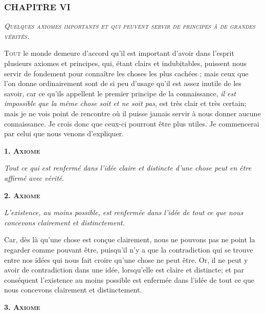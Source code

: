 \subsubsection{\centering \Large CHAPITRE VI}
\begin{center}\emph{\large\scshape Quelques axiomes importants et qui peuvent servir de principes à de grandes vérités.}\end{center}

	\lettrine{T}{out} le monde demeure d'accord qu'il est important d'avoir dans l'esprit plusieurs axiomes et principes, qui, étant clairs et indubitables, puissent nous servir de fondement pour connaître les choses les plus cachées ; mais ceux que l'on donne ordinairement sont de si peu d'usage qu'il est assez inutile de les savoir, car ce qu'ils appellent le premier principe de la connaissance, \emph{il est impossible que la même chose soit et ne soit pas}, est très clair et très certain; mais je ne vois point de rencontre où il puisse jamais servir à nous donner aucune connaissance. Je crois donc que ceux-ci pourront être plus utiles. Je commencerai par celui que nous venons d'expliquer.

\begin{center}{\scshape\bfseries 1. Axiome}\end{center}

	\emph{Tout ce qui est renfermé dans l'idée claire et distincte d'une chose peut en être affirmé avec vérité}.

\begin{center}{\scshape\bfseries 2. Axiome}\end{center}

	\emph{L'existence, au moins possible, est renfermée dans l'idée de tout ce que nous concevons clairement et distinctement}.

Car, dès là qu'une chose est conçue clairement, nous ne pouvons pas ne point la regarder comme pouvant être, puisqu'il n'y a que la contradiction qui se trouve entre nos idées qui nous fait croire qu'une chose ne peut être. Or, il ne peut y avoir de contradiction dans une idée, lorsqu'elle est claire et distincte; et par conséquent l'existence au moins possible est enfermée dans l'idée de tout ce que nous concevons clairement et distinctement.

\begin{center}{\scshape\bfseries 3. Axiome}\end{center}

